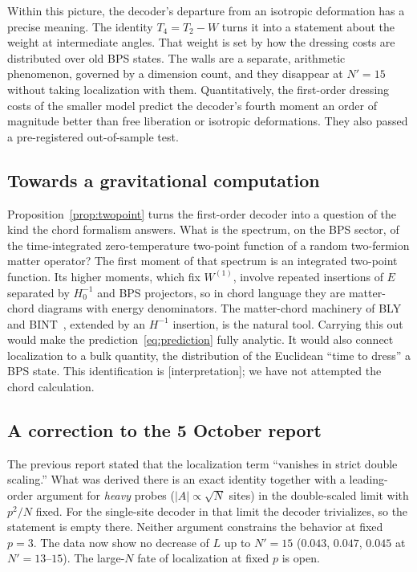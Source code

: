 \documentclass[11pt]{article}
\newcommand{\Np}{N'}
\newcommand{\Wone}{W^{(1)}}
\newcommand{\tagbox}[2]{\textsf{\small\color{#1}[#2]}}
\newcommand{\INTERP}{\tagbox{cconj}{interpretation}}
\theoremstyle{plain}
\theoremstyle{remark}
\numberwithin{equation}{section}
\begin{document}
Within this picture, the decoder's departure from an isotropic deformation has a precise meaning. The identity
$T_4=T_2-W$ turns it into a statement about the weight at intermediate angles. That weight is set by how the dressing
costs are distributed over old BPS states. The walls are a separate, arithmetic phenomenon, governed by a dimension count,
and they disappear at $\Np=15$ without taking localization with them. Quantitatively, the first-order dressing costs of
the smaller model predict the decoder's fourth moment an order of magnitude better than free liberation or isotropic
deformations. They also passed a pre-registered out-of-sample test.

\subsection{Towards a gravitational computation}

Proposition~\ref{prop:twopoint} turns the first-order decoder into a question of the kind the chord formalism answers.
What is the spectrum, on the BPS sector, of the time-integrated zero-temperature two-point function of a random
two-fermion matter operator? The first moment of that spectrum is an integrated two-point function. Its higher moments,
which fix $\Wone$, involve repeated insertions of $E$ separated by $H_0^{-1}$ and BPS projectors, so in chord language they
are matter-chord diagrams with energy denominators. The matter-chord machinery of BLY~\cite{BLY} and BINT~\cite{BINT}, extended by an
$H^{-1}$ insertion, is the natural tool. Carrying this out would make the prediction~\eqref{eq:prediction} fully
analytic. It would also connect localization to a bulk quantity, the distribution of the Euclidean ``time to dress'' a
BPS state. This identification is \INTERP; we have not attempted the chord calculation.

\subsection{A correction to the 5 October report}

The previous report stated that the localization term ``vanishes in strict double scaling.'' What was derived there is
an exact identity together with a leading-order argument for \emph{heavy} probes ($|A|\propto\sqrt N$ sites) in the
double-scaled limit with $p^2/N$ fixed. For the single-site decoder in that limit the decoder trivializes, so the statement
is empty there. Neither argument constrains the behavior at fixed $p=3$. The data now show no decrease of $L$ up to
$\Np=15$ ($0.043$, $0.047$, $0.045$ at $\Np=13$--$15$). The large-$N$ fate of localization at fixed $p$ is open.
\end{document}
